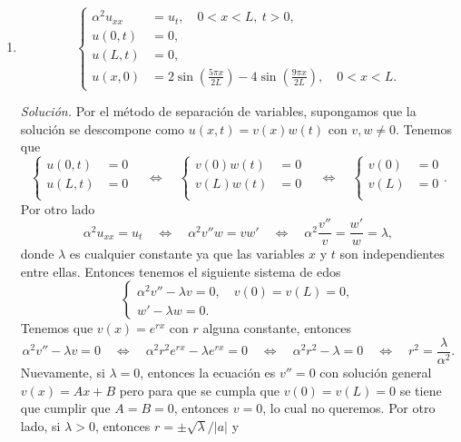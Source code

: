 \documentclass[12pt]{article}
\providecommand{\abs}[1]{\lvert#1\rvert}
\newcommand{\sol}{\textit{Solución. }}
\newcommand{\pp}[1]{\left( #1 \right)}
\newcommand{\Ssi}{\quad\Longleftrightarrow\quad}
\renewcommand{\l}{\lambda}
\renewcommand{\a}{\alpha}
\renewcommand{\abs}[1]{\left\lvert#1\right\rvert}
\begin{document}
\begin{enumerate}
\begin{enumerate}
            \item \[
            \begin{cases}
                \a^2u_{xx} &= u_t,\quad 0<x<L,~t>0,\\
                u(0,t) &= 0,\\
                u(L,t) &= 0,\\
                u(x,0) &= 2\sin\pp{\tfrac{5\pi x}{2L}}-4\sin\pp{\tfrac{9\pi x}{2L}},\quad 0<x<L.
            \end{cases}
            \]

            \sol Por el método de separación de variables, supongamos que la solución se descompone como $u(x,t)=v(x)w(t)$ con $v,w\neq 0$. Tenemos que
            \[
            \begin{cases}
                u(0,t) &= 0\\
                u(L,t) &= 0\\
            \end{cases}
            \Ssi
            \begin{cases}
                v(0)w(t) &= 0\\
                v(L)w(t) &= 0\\
            \end{cases}
            \Ssi
            \begin{cases}
                v(0) &= 0\\
                v(L) &= 0\\
            \end{cases}.
            \]
            Por otro lado
            \[ \a^2u_{xx} = u_t\Ssi \a^2 v''w = vw'\Ssi \a^2 \frac{v''}{v} = \frac{w'}{w}=\l,\]
            donde $\l$ es cualquier constante ya que las variables $x$ y $t$ son independientes entre ellas. Entonces tenemos el siguiente sistema de edos
            \[
            \begin{cases}
                \a^2v''-\l v=0,\quad v(0)=v(L)=0,\\
                w'-\l w=0.
            \end{cases}
            \]
            Tenemos que $v(x)=e^{rx}$ con $r$ alguna constante, entonces
            \[ \a^2v''-\l v=0\Ssi \a^2r^2e^{rx}-\l e^{rx}=0 \Ssi \a^2r^2-\l =0 \Ssi r^2 =\frac{\l}{\a^2}. \]
            Nuevamente, si $\l=0$, entonces la ecuación es $v''=0$ con solución general $v(x)=Ax+B$ pero para que se cumpla que $v(0)=v(L)=0$ se tiene que cumplir que $A=B=0$, entonces $v=0$, lo cual no queremos. Por otro lado, si $\l>0$, entonces $r=\pm\sqrt{\l}/\abs{a}$ y

\end{enumerate}
\end{enumerate}
\end{document}
